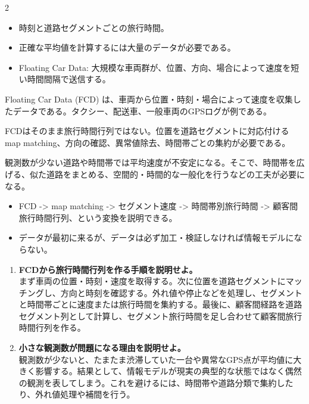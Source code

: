 \clearpage
{}
\begin{multicols}{2}\footnotesize\raggedcolumns
{}
\begin{itemize}
\item 時刻と道路セグメントごとの旅行時間。
\item 正確な平均値を計算するには大量のデータが必要である。
\item Floating Car Data: 大規模な車両群が、位置、方向、場合によって速度を短い時間間隔で送信する。
\end{itemize}
Floating Car Data (FCD) は、車両から位置・時刻・場合によって速度を収集したデータである。タクシー、配送車、一般車両のGPSログが例である。\par

FCDはそのまま旅行時間行列ではない。位置を道路セグメントに対応付ける map matching、方向の確認、異常値除去、時間帯ごとの集約が必要である。\par

観測数が少ない道路や時間帯では平均速度が不安定になる。そこで、時間帯を広げる、似た道路をまとめる、空間的・時間的な一般化を行うなどの工夫が必要になる。\par
{}
\begin{itemize}
\item FCD -> map matching -> セグメント速度 -> 時間帯別旅行時間 -> 顧客間旅行時間行列、という変換を説明できる。
\item データが最初に来るが、データは必ず加工・検証しなければ情報モデルにならない。
\end{itemize}
\begin{enumerate}
\item \textbf{FCDから旅行時間行列を作る手順を説明せよ。}\\まず車両の位置・時刻・速度を取得する。次に位置を道路セグメントにマッチングし、方向と時刻を確認する。外れ値や停止などを処理し、セグメントと時間帯ごとに速度または旅行時間を集約する。最後に、顧客間経路を道路セグメント列として計算し、セグメント旅行時間を足し合わせて顧客間旅行時間行列を作る。
\item \textbf{小さな観測数が問題になる理由を説明せよ。}\\観測数が少ないと、たまたま渋滞していた一台や異常なGPS点が平均値に大きく影響する。結果として、情報モデルが現実の典型的な状態ではなく偶然の観測を表してしまう。これを避けるには、時間帯や道路分類で集約したり、外れ値処理や補間を行う。
\end{enumerate}
\end{multicols}

